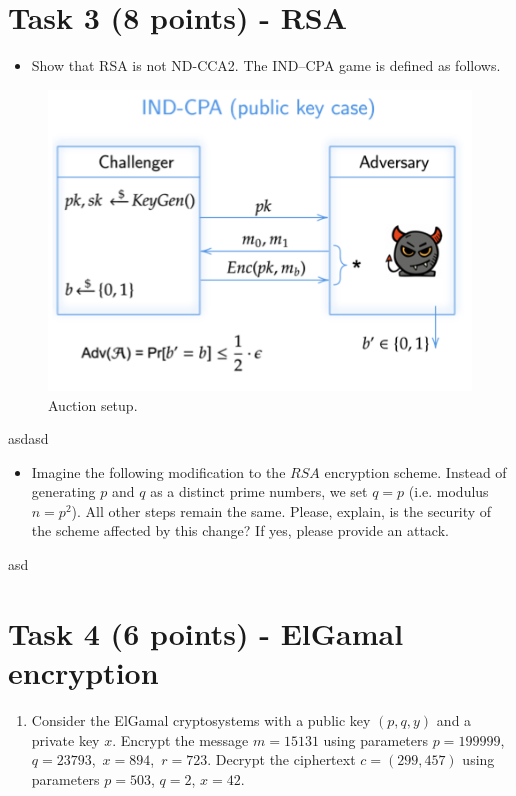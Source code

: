 \documentclass{article}
\begin{document}
\section*{Task 3 (8 points) - RSA} %
\begin{itemize}
    \item Show that RSA is not ND-CCA2. The IND–CPA game is defined as follows.
\end{itemize}
\begin{figure}[H]
    \centering
    \label{fig:task3pic0}
    \includegraphics[scale=0.5, angle=0]{task3_pic0.png}
    \caption{Auction setup.}
\end{figure}

asdasd

\begin{itemize}
    \item Imagine the following modification to the $RSA$ encryption scheme. 
    Instead of generating $p$ and $q$ as a distinct prime numbers, we set $q = p$
    (i.e. modulus $n = p^2$). All other steps remain the same. Please, explain, 
    is the security of the scheme affected by this change? If yes, please provide an attack.
\end{itemize}

asd

\section*{Task 4 (6 points) - ElGamal encryption} %
\begin{enumerate}
    \item Consider the ElGamal cryptosystems with a public key $(p,q,y)$ and a private key $x$. Encrypt the message $m = 15131$ 
    using parameters $p = 199999$,~$q = 23793$,~$x = 894$,~$r = 723$. Decrypt the ciphertext $c = (299,457)$ using parameters $p = 503$, $q = 2$, $x = 42$.
\end{enumerate}
\end{document}
